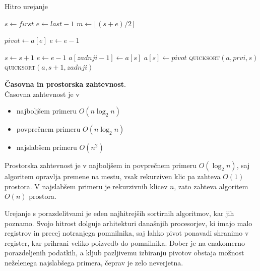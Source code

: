 \documentclass[a4paper,oneside]{article}
\begin{document}
\begin{algorithm}
  \caption{Hitro urejanje}\label{algo:quicksort}
  \begin{algorithmic}[1]
         \Return \EndIf
        \State $s \gets first$
        \State $e \gets last - 1$
        \State $m \gets \lfloor(s+e)/2\rfloor$
  \end{algorithmic}
\end{algorithm}
\begin{algorithm}
  \begin{algorithmic}[1]
        \EndIf

        \State $pivot \gets a[e]$
        \State $e \gets e - 1$

                \State $s \gets s + 1$
            \EndWhile
                \State $e \gets e - 1$
            \EndWhile
            \EndIf
        \EndWhile
        \State $a[zadnji - 1] \gets a[s]$
        \State $a[s] \gets pivot$
        \State \textsc{quicksort}$(a, prvi, s)$
        \State \textsc{quicksort}$(a, s + 1, zadnji)$
    \EndFunction
  \end{algorithmic}
\end{algorithm}

\textbf{Časovna in prostorska zahtevnost}. \\
Časovna zahtevnost je v 
\begin{itemize}
  \item najboljšem primeru $O(n\log_2 n)$
  \item povprečnem primeru $O(n\log_2 n)$
  \item najslabšem primeru $O(n^2)$
\end{itemize}

Prostorska zahtevnost je v najboljšem in povprečnem primeru $O(\log_2 n)$, 
saj algoritem opravlja premene na mestu, vsak rekurziven klic pa zahteva $O(1)$ prostora.
V najslabšem primeru je rekurzivnih klicev $n$, zato zahteva algoritem $O(n)$ prostora.

Urejanje s porazdelitvami je eden najhitrejših sortirnih algoritmov, kar jih
poznamo. Svojo hitrost dolguje arhitekturi današnjih procesorjev, ki imajo
malo registrov in precej notranjega pomnilnika, saj lahko pivot ponavadi shranimo v
register, kar prihrani veliko poizvedb do pomnilnika. Dober je na enakomerno
porazdeljenih podatkih, a kljub pazljivemu izbiranju pivotov obstaja možnost neželenega
najslabšega primera, čeprav je zelo neverjetna. 
\end{document}
